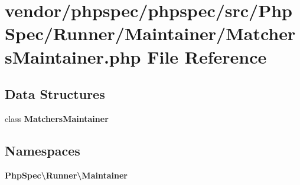 \section{vendor/phpspec/phpspec/src/\+Php\+Spec/\+Runner/\+Maintainer/\+Matchers\+Maintainer.php File Reference}
\label{_matchers_maintainer_8php}
\subsection*{Data Structures}
\begin{DoxyCompactItemize}
\item 
class {\bf Matchers\+Maintainer}
\end{DoxyCompactItemize}
\subsection*{Namespaces}
\begin{DoxyCompactItemize}
\item 
 {\bf Php\+Spec\textbackslash{}\+Runner\textbackslash{}\+Maintainer}
\end{DoxyCompactItemize}
